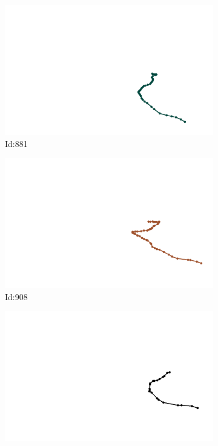 \documentclass[12pt,twoside]{report}
\begin{document}
\begin{figure}
\begin{subfigure}[b]{0.20\textwidth}
\centering
\includegraphics[width=\textwidth]{../trajectories/881.png}
\caption{Id:881}
\end{subfigure}
\begin{subfigure}[b]{0.20\textwidth}
\centering
\includegraphics[width=\textwidth]{../trajectories/908.png}
\caption{Id:908}
\end{subfigure}
\begin{subfigure}[b]{0.20\textwidth}
\centering
\includegraphics[width=\textwidth]{../trajectories/913.png}

\end{subfigure}
\end{figure}
\end{document}
